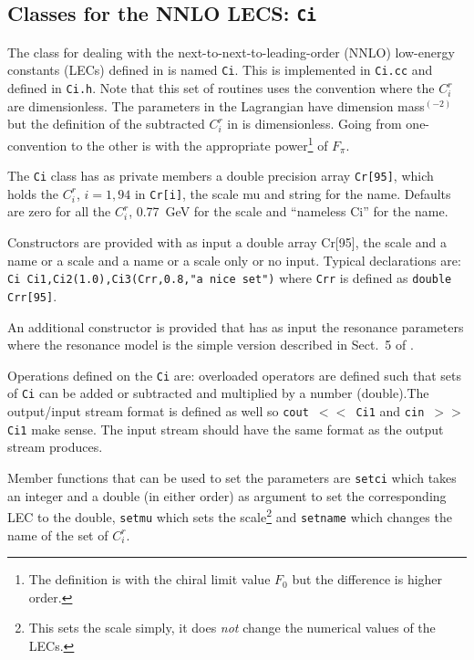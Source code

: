 \documentclass[12pt,a4paper]{article}
\begin{document}
\subsection{Classes for the NNLO LECS: \texttt{Ci}}

The class for dealing with the next-to-next-to-leading-order (NNLO)
low-energy constants (LECs) defined in \cite{Bijnens:1999sh} is
named \texttt{Ci}.
This is implemented in \texttt{Ci.cc} and defined in \texttt{Ci.h}.
Note that this set of routines uses the convention where the $C_i^r$
are dimensionless. The parameters in the Lagrangian have dimension
mass$^{(-2)}$ but the definition of the subtracted $C_i^r$ in
\cite{Bijnens:1999hw} is dimensionless.
Going from one-convention to the other is with the appropriate
power\footnote{The definition is with the chiral limit value $F_0$
but the difference is higher order.}
of $F_\pi$.

The \texttt{Ci} class has as private members
a double precision array \texttt{Cr[95]}, which holds the $C_i^r$, $i=1,94$
in \texttt{Cr[i]}, the scale mu and string for the name.
Defaults are zero for all the $C_i^r$, 0.77~GeV for the scale
and ``nameless Ci'' for the name.

Constructors are provided with as input a double array Cr[95],
the scale and a name or a scale and a name or a scale only or no input.
Typical declarations are:\\
\texttt{Ci Ci1,Ci2(1.0),Ci3(Crr,0.8,"a nice set")} where \texttt{Crr}
is defined as \texttt{double Crr[95]}.

An additional constructor is provided that has as input the resonance parameters
where the resonance model is the simple version described
in Sect.~5 of \cite{Amoros:2000mc}.

Operations defined on the \texttt{Ci} are: overloaded operators are defined
such that sets of \texttt{Ci} can be added or subtracted and multiplied by
a number (double).The output/input stream format is defined as well so
\texttt{cout $<<$ Ci1}
and \texttt{cin $>>$ Ci1} make sense. The input stream should have the same
format as the output stream produces.

Member functions that can be used to set the parameters
are \texttt{setci} which takes an integer and a double (in either order) as
argument to set the corresponding LEC to the double, \texttt{setmu} which
sets the scale\footnote{This sets the scale simply, it does \emph{not} change
the numerical values of the LECs.}
 and \texttt{setname} which changes the name of the set of $C_i^r$.
\end{document}
